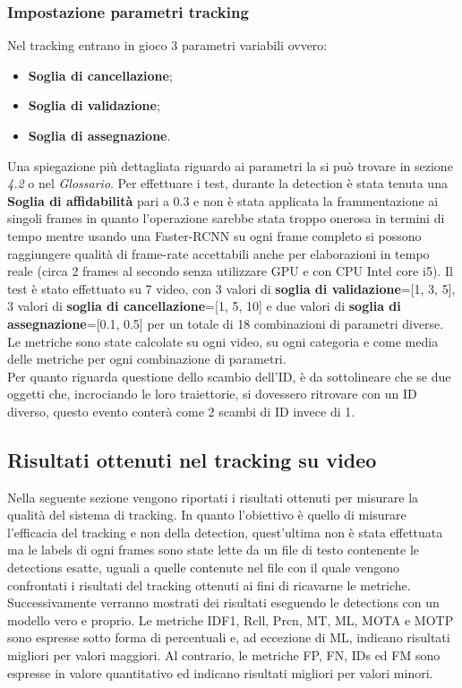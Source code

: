 \subsubsection{Impostazione parametri tracking}
Nel tracking entrano in gioco 3 parametri variabili ovvero:
\begin{itemize}
\item \textbf{Soglia di cancellazione};
\item \textbf{Soglia di validazione};
\item \textbf{Soglia di assegnazione}.
\end{itemize}
Una spiegazione più dettagliata riguardo ai parametri la si può trovare in sezione \textit{4.2} o nel \textit{Glossario}.
Per effettuare i test, durante la detection è stata tenuta una \textbf{Soglia di affidabilità} pari a 0.3 e non è stata applicata la frammentazione ai singoli frames in quanto l'operazione sarebbe stata troppo onerosa in termini di tempo mentre usando una Faster-RCNN su ogni frame completo si possono raggiungere qualità di frame-rate accettabili anche per elaborazioni in tempo reale (circa 2 frames al secondo senza utilizzare GPU e con CPU Intel core i5).
Il test è stato effettuato su 7 video, con 3 valori di \textbf{soglia di validazione}=[1, 3, 5], 3 valori di \textbf{soglia di cancellazione}=[1, 5, 10] e due valori di \textbf{soglia di assegnazione}=[0.1, 0.5] per un totale di 18 combinazioni di parametri diverse. Le metriche sono state calcolate su ogni video, su ogni categoria e come media delle metriche per ogni combinazione di parametri.\\
Per quanto riguarda questione dello scambio dell'ID, è da sottolineare che se due oggetti che, incrociando le loro traiettorie, si dovessero ritrovare con un ID diverso, questo evento conterà come 2 scambi di ID invece di 1.

\subsection{Risultati ottenuti nel tracking su video}
Nella seguente sezione vengono riportati i risultati ottenuti per misurare la qualità del sistema di tracking. In quanto l'obiettivo è quello di misurare l'efficacia del tracking e non della detection, quest'ultima non è stata effettuata ma le labels di ogni frames sono state lette da un file di testo contenente le detections esatte, uguali a quelle contenute nel file con il quale vengono confrontati i risultati del tracking ottenuti ai fini di ricavarne le metriche. Successivamente verranno mostrati dei risultati eseguendo le detections con un modello vero e proprio. Le metriche IDF1, Rcll, Prcn, MT, ML, MOTA e MOTP sono espresse sotto forma di percentuali e, ad eccezione di ML, indicano risultati migliori per valori maggiori. Al contrario, le metriche FP, FN, IDs ed FM sono espresse in valore quantitativo ed indicano risultati migliori per valori minori.

